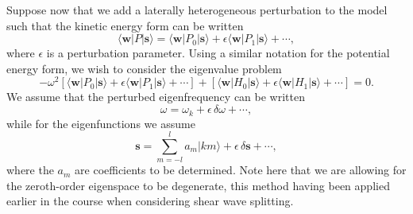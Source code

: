 Suppose now that we add a laterally heterogeneous perturbation to the model such that the kinetic energy form can be written
\begin{equation}\label{eq:21}
\langle \mathbf{w}|P|\mathbf{s}\rangle=\langle \mathbf{w}|P_{0}|\mathbf{s}\rangle+\epsilon\langle \mathbf{w}|P_{1}|\mathbf{s}\rangle+\cdots,
\end{equation}
where $\epsilon$ is a perturbation parameter. Using a similar notation for the potential energy form, we wish to consider the eigenvalue problem
\begin{equation}\label{eq:22}
-\omega^{2}[\langle \mathbf{w}|P_{0}|\mathbf{s}\rangle+\epsilon\langle \mathbf{w}|P_{1}|\mathbf{s}\rangle+\cdots]
+[\langle \mathbf{w}|H_{0}|\mathbf{s}\rangle+\epsilon\langle \mathbf{w}|H_{1}|\mathbf{s}\rangle+\cdots]=0.
\end{equation}
We assume that the perturbed eigenfrequency can be written
\begin{equation}\label{eq:23}
\omega=\omega_{k}+\epsilon\,\delta\omega+\cdots,
\end{equation}
while for the eigenfunctions we assume
\begin{equation}\label{eq:24}
\mathbf{s}=\sum_{m=-l}^{l}a_{m}|km\rangle+\epsilon\,\delta\mathbf{s}+\cdots,
\end{equation}
where the $a_{m}$ are coefficients to be determined. Note here that we are allowing for the zeroth-order eigenspace to be degenerate,
 this method having been applied earlier in the course when considering shear wave splitting. 
 
